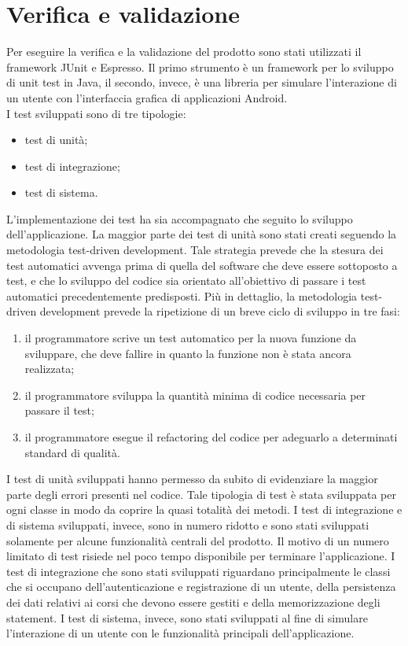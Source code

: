 \documentclass[../Tesi.tex]{subfiles}
\begin{document}
\section{Verifica e validazione}\label{sec:VerificaEValidazione}
	Per eseguire la verifica e la validazione del prodotto sono stati utilizzati il framework JUnit e Espresso. Il primo strumento è un framework per lo sviluppo di unit test in Java, il secondo, invece, è una libreria per 
	simulare l'interazione di un utente con l'interfaccia grafica di applicazioni Android. \\
	I test sviluppati sono di tre tipologie:
	\begin{itemize}
		\item test di unità;
		\item test di integrazione;
		\item test di sistema.
	\end{itemize}
	L'implementazione dei test ha sia accompagnato che seguito lo sviluppo dell'applicazione. La maggior parte dei test di unità sono stati creati seguendo la metodologia test-driven development. Tale strategia prevede che la stesura dei test automatici avvenga prima di quella del software che deve essere sottoposto a test, e che lo sviluppo del codice sia orientato all'obiettivo di passare i test automatici precedentemente predisposti. Più in dettaglio, la metodologia test-driven development prevede la ripetizione di un breve ciclo di sviluppo in tre fasi:
	\begin{enumerate}
		\item il programmatore scrive un test automatico per la nuova funzione da sviluppare, che deve fallire in quanto la funzione non è stata ancora realizzata;
		\item il programmatore sviluppa la quantità minima di codice necessaria per passare il test;
		\item il programmatore esegue il refactoring del codice per adeguarlo a determinati standard di qualità.
	\end{enumerate}
	I test di unità sviluppati hanno permesso da subito di evidenziare la maggior parte degli errori presenti nel codice. Tale tipologia di test è stata sviluppata per ogni classe in modo da coprire la quasi totalità dei metodi. I test di integrazione e di sistema sviluppati, invece, sono in numero ridotto e sono stati sviluppati solamente per alcune funzionalità centrali del prodotto. Il motivo di un numero limitato di test risiede nel poco tempo disponibile per terminare l'applicazione. I test di integrazione che sono stati sviluppati riguardano principalmente le classi che si occupano dell'autenticazione e registrazione di un utente, della persistenza dei dati relativi ai corsi che devono essere gestiti e della memorizzazione degli statement. I test di sistema, invece, sono stati sviluppati al fine di simulare l'interazione di un utente con le funzionalità principali dell'applicazione.\\
\end{document}

